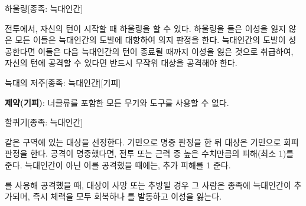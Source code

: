 \documentclass{report}
\begin{document}
	\begin{story}{하울링}{[종족: 늑대인간]}
		
		전투에서, 자신의 턴이 시작할 때 하울링을 할 수 있다. 하울링을 들은 이성을 잃지 않은 모든 이들은 늑대인간의 도발에 대항하여 의지 판정을 한다. 늑대인간의 도발이 성공한다면 이들은 다음 늑대인간의 턴이 종료될 때까지 이성을 잃은 것으로 취급하여, 자신의 턴에 공격할 수 있다면 반드시 무작위 대상을 공격해야 한다.
		
		\smallskip
		
	\end{story}
	
	\begin{story}{늑대의 저주}{[종족: 늑대인간][기피]}
		
		\textbf{제약(기피)}: 너클류를 포함한 모든 무기와 도구를 사용할 수 없다.
		
		\smallskip
		
	\end{story}
	
	\begin{story}{할퀴기}{[종족: 늑대인간]}
		
		같은 구역에 있는 대상을 선정한다. 기민으로 명중 판정을 한 뒤 대상은 기민으로 회피 판정을 한다. 공격이 명중했다면, 전투 또는 근력 중 높은 수치만큼의 피해(최소 1)를 준다. 늑대인간이 아닌 이를 공격했을 때에는, 추가 피해를 1 준다.
		
		를 사용해 공격했을 때, 대상이 사망 또는 추방될 경우 그 사람은 종족에 늑대인간이 추가되며, 즉시 체력을 모두 회복하나 를 발동하고 이성을 잃는다.
		
		\smallskip
		
	\end{story}
\end{document}
